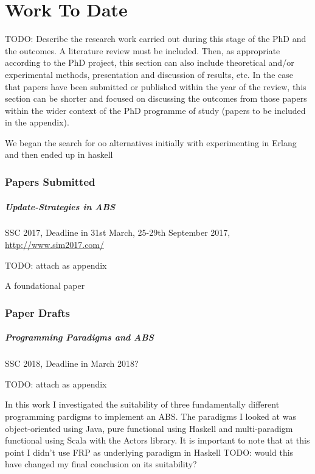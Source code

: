 \chapter{Work To Date}
\label{chap:work}

TODO: Describe the research work carried out during this stage of the PhD and the outcomes. A literature review must be included. Then, as appropriate according to the PhD project, this section can also include theoretical and/or experimental methods, presentation and discussion of results, etc. In the case that papers have been submitted or published within the year of the review, this section can be shorter and focused on discussing the outcomes from those papers within the wider context of the PhD programme of study (papers to be included in the appendix).

We began the search for oo alternatives initially with experimenting in Erlang and then ended up in haskell

\subsection{Papers Submitted}
\paragraph{Update-Strategies in ABS}
SSC 2017, Deadline in 31st March, 25-29th September 2017, \url{http://www.sim2017.com/}


TODO: attach as appendix

A foundational paper

\subsection{Paper Drafts}
\paragraph{Programming Paradigms and ABS}
SSC 2018, Deadline in March 2018?

TODO: attach as appendix

In this work I investigated the suitability of three fundamentally different programming pardigms to implement an ABS. The paradigms I looked at was object-oriented using Java, pure functional using Haskell and multi-paradigm functional using Scala with the Actors library. It is important to note that at this point I didn't use FRP as underlying paradigm in Haskell TODO: would this have changed my final conclusion on its suitability?

